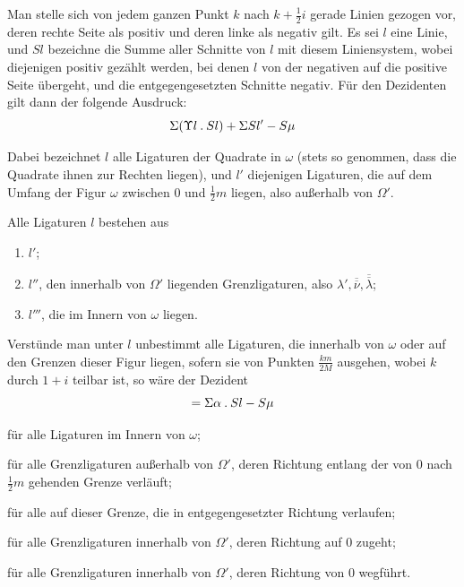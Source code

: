 Man stelle sich von jedem ganzen Punkt $k$ nach $k+\frac12i$ gerade Linien gezogen vor, deren rechte Seite als positiv und deren linke als negativ gilt. Es sei $l$ eine Linie, und $Sl$ bezeichne die Summe aller Schnitte von $l$ mit diesem Liniensystem, wobei diejenigen positiv gezählt werden, bei denen $l$ von der negativen auf die positive Seite übergeht, und die entgegengesetzten Schnitte negativ. Für den Dezidenten gilt dann der folgende Ausdruck:
\[
\Sigma(\Upsilon l\mathbin{.} Sl)+\Sigma Sl'-S\mu
\]

Dabei bezeichnet $l$ alle Ligaturen der Quadrate in $\omega$ (stets so genommen, dass die Quadrate ihnen zur Rechten liegen), und $l'$ diejenigen Ligaturen, die auf dem Umfang der Figur $\omega$ zwischen $0$ und $\frac12m$ liegen, also außerhalb von $\Omega'$.

Alle Ligaturen $l$ bestehen aus
\begin{enumerate}
\item[1)] $l'$;
\item[2)] $l''$, den innerhalb von $\Omega'$ liegenden Grenzligaturen, also $\lambda',\overline{\overline\nu},\overline{\overline\lambda}$;
\item[3)] $l'''$, die im Innern von $\omega$ liegen.
\end{enumerate}
Verstünde man unter $l$ unbestimmt alle Ligaturen, die innerhalb von $\omega$ oder auf den Grenzen dieser Figur liegen, sofern sie von Punkten $\frac{km}{2M}$ ausgehen, wobei $k$ durch $1+i$ teilbar ist, so wäre der Dezident
\[
=\Sigma\alpha\mathbin{.} Sl-S\mu
\]

\begin{list}{}{\setlength{\labelwidth}{5em}\setlength{\leftmargin}{5.5em}}
\item[wobei $\alpha=1$] für alle Ligaturen im Innern von $\omega$;
\item[$\alpha=\Upsilon l+1$] für alle Grenzligaturen außerhalb von $\Omega'$, deren Richtung entlang der von $0$ nach $\frac12m$ gehenden Grenze verläuft;
\end{list}


\begin{list}{}{\setlength{\labelwidth}{9em}\setlength{\leftmargin}{9.5em}}
\item[$\alpha=-(\Upsilon\overline{\overline\lambda}+1)=-\Upsilon l$] für alle auf dieser Grenze, die in entgegengesetzter Richtung verlaufen;
\item[$\alpha=\Upsilon l$] für alle Grenzligaturen innerhalb von $\Omega'$, deren Richtung auf $0$ zugeht;
\item[$\alpha=-\Upsilon l+1$] für alle Grenzligaturen innerhalb von $\Omega'$, deren Richtung von $0$ wegführt.
\end{list}

